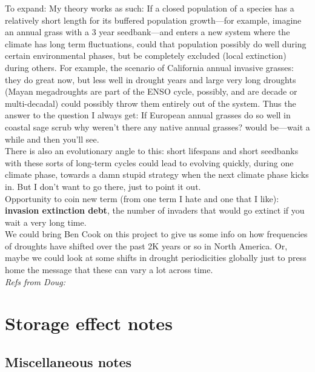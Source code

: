 \documentclass[11pt,a4paper,oneside]{article}
\begin{document}
To expand: My theory works as such: If a closed population of a species has a relatively short length for its buffered population growth---for example, imagine an annual grass with a 3 year seedbank---and enters a new system where the climate has long term fluctuations, could that population possibly do well during certain environmental phases, but be completely excluded (local extinction) during others. For example, the scenario of California annual invasive grasses: they do great now, but less well in drought years and large very long droughts (Mayan megadroughts are part of the ENSO cycle, possibly, and are decade or multi-decadal) could possibly throw them entirely out of the system. Thus the answer to the question I always get: If European annual grasses do so well in coastal sage scrub why weren't there any native annual grasses? would be---wait a while and  then you'll see. \\

There is also an evolutionary angle to this: short lifespans and short seedbanks with these sorts of long-term cycles could lead to evolving quickly, during one climate phase, towards a damn stupid strategy when the next climate phase kicks in. But I don't want to go there, just to point it out.\\

\noindent Opportunity to coin new term (from one term I hate and one that I like): {\bf invasion extinction debt}, the number of invaders that would go extinct if you wait a very long time. \\

\noindent We could bring Ben Cook on this project to give us some info on how frequencies of droughts have shifted over the past 2K years or so in North America. Or, maybe we could look at some shifts in drought periodicities globally just to press home the message that these can vary a lot across time. \\

\noindent \emph{Refs from Doug:} \citep{Davison2010,morris2008,Tuljapurkar2009}

\section{Storage effect notes}

\subsection{Miscellaneous notes}
\end{document}
